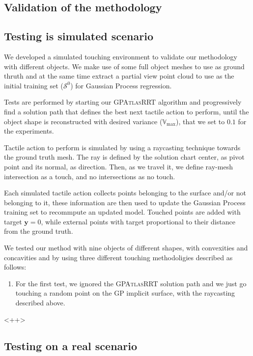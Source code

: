 \subsection{Validation of the methodology}

\subsection{Testing is simulated scenario}\label{sec:synth}
We developed a simulated touching environment to validate our methodology with
different objects. We make use of some full object meshes to use as ground thruth and
at the same time extract a partial view point cloud to use as the initial training
set ($\mathcal{S}^0$) for Gaussian Process regression.

Tests are performed by starting our \textsc{GPAtlasRRT} algorithm and progressively
find a solution path that defines the best next tactile action to perform, until
the object shape is reconstructed with desired variance ($\mathbb{V}_{\max}$), that
we set to $0.1$ for the experiments.

Tactile action to perform is simulated by using a raycasting technique towards the ground truth mesh.
The ray is defined by the solution chart center, as pivot point and its normal, as direction.
Then, as we travel it, we define  ray-mesh intersection as a touch, and no intersections
as no touch.

Each simulated tactile action collects points belonging to the surface and/or not belonging to it,
these information are then used to update the Gaussian Process training set to recommpute
an updated model. Touched points are added with target $\mathbf{y}=0$, while external points
with target proportional to their distance from the ground truth.

We tested our method with nine objects of different shapes, with convexities and concavities and by using
three different touching methodoligies described as follows:
\begin{enumerate}
    \item For the first test, we ignored the \textsc{GPAtlasRRT} solution path and we just go touching a random point
        on the GP implicit surface, with the raycasting described above.
\end{enumerate}<++>
\subsection{Testing on a real scenario}
\label{sec:real}

